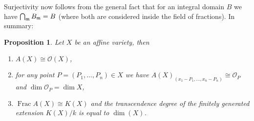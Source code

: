 \documentclass[12pt]{article}
\theoremstyle{plain}
\newtheorem{proposition}[thm]{Proposition}
\theoremstyle{definition}
\newcommand{\call}[1]{\mathcal{#1}}
\begin{document}
Surjectivity now follows from the general fact that for an integral domain $B$ we have $\bigcap_{\frak{m}}B_\frak{m} = B$ (where both are considered inside the field of fractions). In summary:

\begin{proposition}
\label{prop:affine_basics}
Let $X$ be an affine variety, then
\begin{enumerate}
    \item $A(X) \cong \call{O}(X)$,
    \item for any point $P = (P_1,...,P_n) \in X$ we have $A(X)_{(x_1 - P_1,...,x_n - P_n)} \cong \call{O}_P$ and $\operatorname{dim}\call{O}_P = \operatorname{dim}X$,
    \item $\operatorname{Frac}A(X) \cong K(X)$ and the transcendence degree of the finitely generated extension $K(X)/k$ is equal to $\operatorname{dim}(X)$.
\end{enumerate}
\end{proposition}
\end{document}

